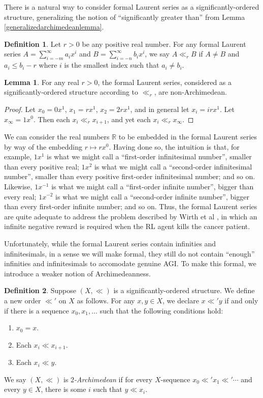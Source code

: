\documentclass[reqno]{article}
\theoremstyle{definition}
\newtheorem{lemma}[theorem]{Lemma}
\newtheorem{definition}{Definition}
\begin{document}
There is a natural way to consider formal Laurent series as a significantly-ordered
structure, generalizing the notion of ``significantly greater than'' from
Lemma \ref{generalizedarchimedeanlemma}.

\begin{definition}
\label{significantorderednessoflaurent}
Let $r>0$ be any positive real number.
For any formal Laurent series $A=\sum_{i=-m}^\infty a_ix^i$
and $B=\sum_{i=-n}^\infty b_ix^i$,
we say $A\ll_r B$ if $A\not=B$ and $a_i\leq b_i-r$ where $i$ is the smallest
index such that $a_i\not=b_i$.
\end{definition}

\begin{lemma}
For any real $r>0$, the formal Laurent series, considered as a significantly-ordered
structure according to $\ll_r$, are non-Archimedean.
\end{lemma}

\begin{proof}
Let $x_0=0x^1$, $x_1=rx^1$, $x_2=2rx^1$, and in general let
$x_i=irx^1$. Let $x_\infty=1x^0$. Then each $x_i\ll_r x_{i+1}$,
and yet each $x_i\ll_r x_\infty$.
\end{proof}

We can consider the real numbers $\mathbb R$ to be embedded in the formal Laurent
series by way of the embedding $r\mapsto rx^0$. Having done so, the intuition is that,
for example, $1x^1$ is what we might call a ``first-order infinitesimal number'', smaller
than every positive real;
$1x^2$ is what we might call a ``second-order infinitesimal number'', smaller than every
positive first-order infinitesimal number; and so on. Likewise,
$1x^{-1}$ is what we might call a ``first-order infinite number'', bigger than
every real; $1x^{-2}$ is what we might call a ``second-order infinite number'', bigger
than every first-order infinite number; and so on. Thus, the formal Laurent series are
quite adequate to address the problem described by
Wirth et al \cite{wirth2017survey}, in which an infinite negative reward is required when the
RL agent kills the cancer patient.

Unfortunately, while the formal Laurent series contain infinities and infinitesimals,
in a sense we will make formal, they still do not contain ``enough'' infinities and
infinitesimals to accomodate genuine AGI. To make this formal, we introduce a weaker
notion of Archimedeanness.

\begin{definition}
Suppose $(X,\ll)$ is a significantly-ordered structure.
We define a new order $\ll'$ on $X$ as follows.
For any $x,y\in X$, we declare $x\ll' y$ if and only if there is a sequence
$x_0,x_1,\ldots$ such that the following conditions hold:
\begin{enumerate}
    \item
    $x_0=x$.
    \item
    Each $x_i\ll x_{i+1}$.
    \item
    Each $x_i\ll y$.
\end{enumerate}
We say $(X,\ll)$ is \emph{$2$-Archimedean} if for every $X$-sequence
$x_0\ll' x_1\ll' \cdots$ and every $y\in X$, there is some $i$ such that
$y\ll x_i$.
\end{definition}
\end{document}
